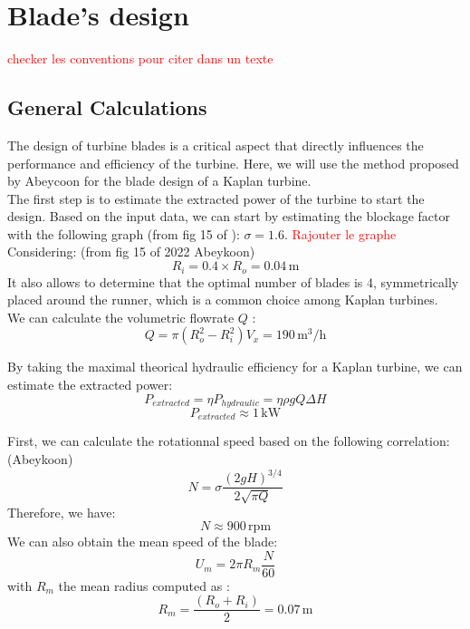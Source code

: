 \section{Blade's design}

\textcolor{red}{checker les conventions pour citer dans un texte}

\subsection{General Calculations}

The design of turbine blades is a critical aspect that directly influences the performance and efficiency of the turbine. Here, we will use the method proposed by Abeycoon \cite{abeykoon2022} for the blade design of a Kaplan turbine.\\

The first step is to estimate the extracted power of the turbine to start the design.
Based on the input data, we can start by estimating the blockage factor with the following graph (from fig 15 of \cite{abeykoon2022}): $\sigma = 1.6$. \textcolor{red}{Rajouter le graphe}\\

Considering: (from fig 15 of 2022 Abeykoon)
\begin{equation}
    R_i = 0.4 \times R_o = 0.04 \, \mathrm{m}
\end{equation}
It also allows to determine that the optimal number of blades is 4, symmetrically placed around the runner, which is a common choice among Kaplan turbines.\\

We can calculate the volumetric flowrate $Q$ :
\begin{equation}
    Q = \pi (R_o^2 - R_i^2) V_x
      = 190 \, \mathrm{m^3/h}
\end{equation}

By taking the maximal theorical hydraulic efficiency for a Kaplan turbine,
we can estimate the extracted power:
\begin{equation}
    P_{extracted} = \eta P_{hydraulic} = \eta \rho g Q \Delta H
\end{equation}
\begin{equation}
    P_{extracted} \approx 1 \, \mathrm{kW}
\end{equation}

First, we can calculate the rotationnal speed based on the following correlation: (Abeykoon)
\begin{equation}
N = \sigma \frac{(2gH)^{3/4}}{2\sqrt{\pi Q}}
\end{equation}
Therefore, we have:
\begin{equation}
N \approx 900 \, \mathrm{rpm}
\end{equation}
We can also obtain the mean speed of the blade:
\begin{equation}
U_m = 2\pi R_m \frac{N}{60}
\end{equation}
with $R_m$ the mean radius computed as :
\begin{equation}
R_m = \frac{(R_o + R_i)}{2} = 0.07 \, \mathrm{m}
\end{equation}

